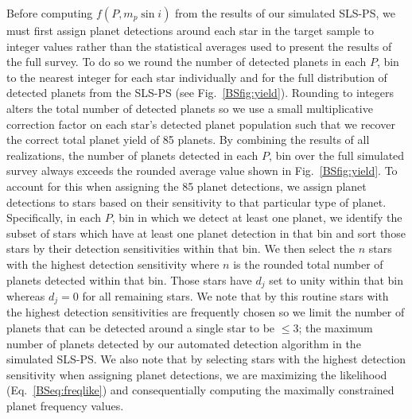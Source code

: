 Before computing $f(P,m_p\sin{i})$ from the results of our simulated SLS-PS, we must first assign planet
detections around each star in the target sample to integer values rather than the statistical
averages used to present the results of the full survey. To do so we round the number of detected planets
in each $P$, \msini{} bin to the nearest integer for each star individually and for the full distribution
of detected planets from the SLS-PS (see Fig.~\ref{BSfig:yield}). Rounding to integers
alters the total number of detected
planets so we use a small multiplicative correction factor on each star's detected planet population such
that we recover the correct total planet yield of 85 planets. By combining the results of all
realizations, the number of planets detected in each $P$, \msini{} bin over the full simulated survey
always exceeds the rounded average value shown in Fig.~\ref{BSfig:yield}. To account for this when
assigning the 85 planet detections, we assign planet detections to stars based on their sensitivity
to that particular type of planet. Specifically, in each $P$, \msini{} bin in which
we detect at least one planet, we identify the subset of stars which have at least one planet
detection in that bin and
sort those stars by their detection sensitivities within that bin. We then select the $n$ stars with the highest
detection sensitivity where $n$ is the rounded total number of planets detected within that bin.
Those stars have $d_j$ set to unity within that bin whereas $d_j=0$ for all remaining stars.
We note that by this routine stars
with the highest detection sensitivities are frequently chosen so we limit the number of planets that can be
detected around a single star to be $\leq 3$; the maximum number of planets detected by our automated
detection algorithm in the simulated SLS-PS. We also note that by selecting stars with the highest
detection sensitivity when assigning planet detections, we are maximizing the likelihood
(Eq.~\ref{BSeq:freqlike}) and consequentially computing the maximally constrained planet frequency values. \\


